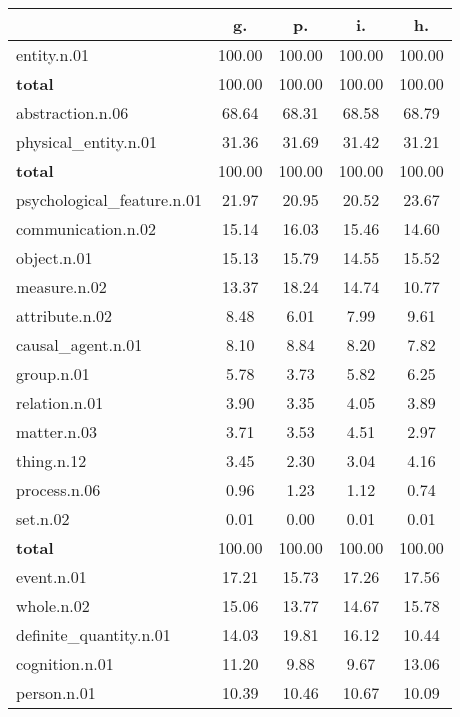 \begin{table}[h!]
\begin{center}
\begin{tabular}{| l || c | c | c | c |}\hline
 & {\bf g.} & {\bf p.} & {\bf i.} & {\bf h.} \\\hline\hline
entity.n.01 & 100.00  & 100.00  & 100.00  & 100.00 \\\hline\hline
{{\bf total}} & 100.00  & 100.00  & 100.00  & 100.00 \\\hline\hline\hline
abstraction.n.06 & 68.64  & 68.31  & 68.58  & 68.79 \\\hline
physical\_entity.n.01 & 31.36  & 31.69  & 31.42  & 31.21 \\\hline\hline
{{\bf total}} & 100.00  & 100.00  & 100.00  & 100.00 \\\hline\hline\hline
psychological\_feature.n.01 & 21.97  & 20.95  & 20.52  & 23.67 \\\hline
communication.n.02 & 15.14  & 16.03  & 15.46  & 14.60 \\\hline
object.n.01 & 15.13  & 15.79  & 14.55  & 15.52 \\\hline
measure.n.02 & 13.37  & 18.24  & 14.74  & 10.77 \\\hline
attribute.n.02 & 8.48  & 6.01  & 7.99  & 9.61 \\\hline
causal\_agent.n.01 & 8.10  & 8.84  & 8.20  & 7.82 \\\hline
group.n.01 & 5.78  & 3.73  & 5.82  & 6.25 \\\hline
relation.n.01 & 3.90  & 3.35  & 4.05  & 3.89 \\\hline
matter.n.03 & 3.71  & 3.53  & 4.51  & 2.97 \\\hline
thing.n.12 & 3.45  & 2.30  & 3.04  & 4.16 \\\hline
process.n.06 & 0.96  & 1.23  & 1.12  & 0.74 \\\hline
set.n.02 & 0.01  & 0.00  & 0.01  & 0.01 \\\hline\hline
{{\bf total}} & 100.00  & 100.00  & 100.00  & 100.00 \\\hline\hline\hline
event.n.01 & 17.21  & 15.73  & 17.26  & 17.56 \\\hline
whole.n.02 & 15.06  & 13.77  & 14.67  & 15.78 \\\hline
definite\_quantity.n.01 & 14.03  & 19.81  & 16.12  & 10.44 \\\hline
cognition.n.01 & 11.20  & 9.88  & 9.67  & 13.06 \\\hline
person.n.01 & 10.39  & 10.46  & 10.67  & 10.09 \\\hline

\end{tabular}
\end{center}
\end{table}
